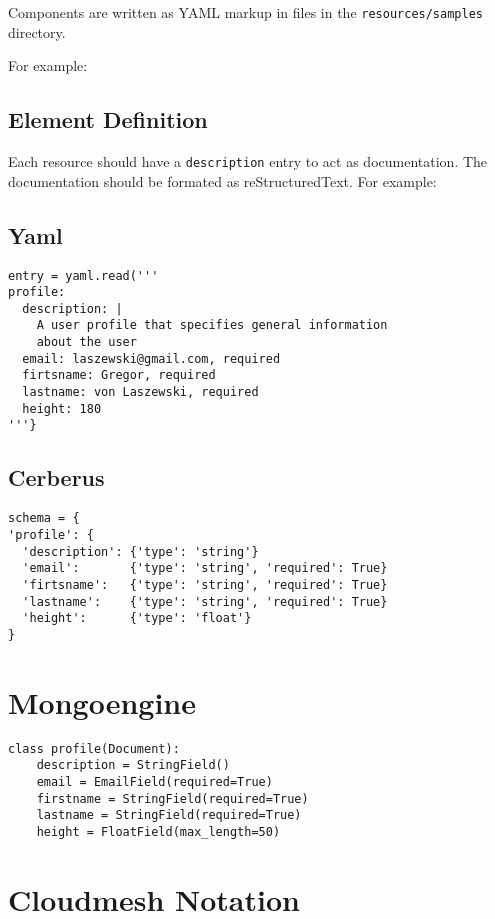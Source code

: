 \documentclass[9pt,twocolumn]{styles/osajnl}
\begin{document}
Components are written as YAML markup in files in the
\verb+resources/samples+ directory.

For example:


\subsection{Element Definition}

Each resource should have a \verb+description+ entry to act as
documentation. The documentation should be formated as
reStructuredText. For example:

\subsection{Yaml}

\begin{Verbatim}
entry = yaml.read('''
profile:
  description: |
    A user profile that specifies general information 
    about the user
  email: laszewski@gmail.com, required
  firtsname: Gregor, required
  lastname: von Laszewski, required
  height: 180
'''}
\end{Verbatim}

\subsection{Cerberus}

\begin{Verbatim}
schema = {
'profile': {
  'description': {'type': 'string'}
  'email':       {'type': 'string', 'required': True}
  'firtsname':   {'type': 'string', 'required': True}
  'lastname':    {'type': 'string', 'required': True}
  'height':      {'type': 'float'}
}
\end{Verbatim}

\section{Mongoengine}

\begin{Verbatim}
class profile(Document):
    description = StringField()
    email = EmailField(required=True)
    firstname = StringField(required=True)
    lastname = StringField(required=True)
    height = FloatField(max_length=50)
\end{Verbatim}

\section{Cloudmesh Notation}
\end{document}
